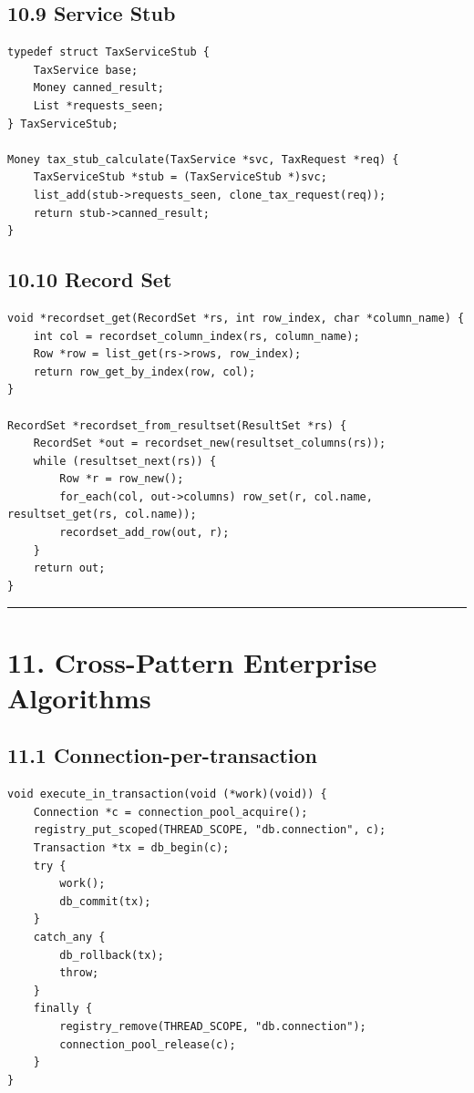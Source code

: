\documentclass[11pt]{article}
\begin{document}
\subsection{10.9 Service Stub}\label{service-stub}

\begin{verbatim}
typedef struct TaxServiceStub {
    TaxService base;
    Money canned_result;
    List *requests_seen;
} TaxServiceStub;

Money tax_stub_calculate(TaxService *svc, TaxRequest *req) {
    TaxServiceStub *stub = (TaxServiceStub *)svc;
    list_add(stub->requests_seen, clone_tax_request(req));
    return stub->canned_result;
}
\end{verbatim}

\subsection{10.10 Record Set}\label{record-set}

\begin{verbatim}
void *recordset_get(RecordSet *rs, int row_index, char *column_name) {
    int col = recordset_column_index(rs, column_name);
    Row *row = list_get(rs->rows, row_index);
    return row_get_by_index(row, col);
}

RecordSet *recordset_from_resultset(ResultSet *rs) {
    RecordSet *out = recordset_new(resultset_columns(rs));
    while (resultset_next(rs)) {
        Row *r = row_new();
        for_each(col, out->columns) row_set(r, col.name, resultset_get(rs, col.name));
        recordset_add_row(out, r);
    }
    return out;
}
\end{verbatim}

\begin{center}\rule{0.5\linewidth}{0.5pt}\end{center}

\section{11. Cross-Pattern Enterprise
Algorithms}\label{cross-pattern-enterprise-algorithms}

\subsection{11.1
Connection-per-transaction}\label{connection-per-transaction}

\begin{verbatim}
void execute_in_transaction(void (*work)(void)) {
    Connection *c = connection_pool_acquire();
    registry_put_scoped(THREAD_SCOPE, "db.connection", c);
    Transaction *tx = db_begin(c);
    try {
        work();
        db_commit(tx);
    }
    catch_any {
        db_rollback(tx);
        throw;
    }
    finally {
        registry_remove(THREAD_SCOPE, "db.connection");
        connection_pool_release(c);
    }
}
\end{verbatim}
\end{document}
